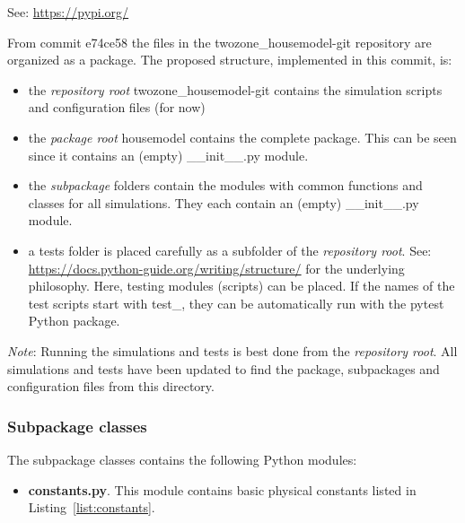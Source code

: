 See: \url{https://pypi.org/}

From commit \textsf{e74ce58} the files in the \textsf{twozone\_housemodel-git} repository are organized as a package. The proposed structure, implemented in this commit, is:


\begin{itemize}
	\item the \emph{repository root} \textsf{twozone\_housemodel-git} contains the simulation scripts and configuration files (for now) 
	\item the \emph{package root} \textsf{housemodel} contains the complete package. This can be seen since it contains an (empty) \textsf{\_\_init\_\_.py} module.
	\item the \emph{subpackage} folders contain the modules with common functions and classes for all simulations. They each contain an (empty) \textsf{\_\_init\_\_.py} module.
	\item a \textsf{tests} folder is placed carefully as a subfolder of the \emph{repository root}. 
	See: \url{https://docs.python-guide.org/writing/structure/} for the underlying philosophy. Here, testing modules (scripts) can be placed. If the names of the test scripts start with \textsf{test\_}, they can be automatically run with the \textsf{pytest} Python package.
\end{itemize}

\textit{Note}: Running the simulations and tests is best done from the \emph{repository root}. All simulations and tests have been updated to find the package, subpackages and configuration files from this directory.

\subsubsection{Subpackage \textsf{classes}}
 The subpackage \textsf{classes} contains the following Python modules:

 \begin{itemize}
	\item \textbf{constants.py}. This module contains basic physical constants listed in Listing~\ref{list:constants}.
\end{itemize}

